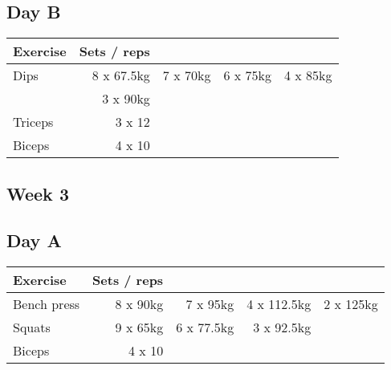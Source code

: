 \documentclass[12pt, a4paper]{article}%
\begin{document}
  \subsection*{\hspace{0.5em} Day B }


  \begin{tabular}{l|rrrr}
  \hspace{0.75em} \textbf{Exercise} & \textbf{Sets / reps} \\ \hline

            \hspace{0.75em} Dips
            & 8 x 67.5kg
            & 7 x 70kg
            & 6 x 75kg
            & 4 x 85kg
            \\


            \hspace{0.75em}
            & 3 x 90kg
            & 
            & 
            & 
            \\


   \hspace{0.75em} Triceps & 3 x 12 \\
   \hspace{0.75em} Biceps & 4 x 10 \\
  \end{tabular}

 \subsection*{\hspace{0.25em} Week 3 }
  \subsection*{\hspace{0.5em} Day A }


  \begin{tabular}{l|rrrr}
  \hspace{0.75em} \textbf{Exercise} & \textbf{Sets / reps} \\ \hline

            \hspace{0.75em} Bench press
            & 8 x 90kg
            & 7 x 95kg
            & 4 x 112.5kg
            & 2 x 125kg
            \\


            \hspace{0.75em} Squats
            & 9 x 65kg
            & 6 x 77.5kg
            & 3 x 92.5kg
            & 
            \\


   \hspace{0.75em} Biceps & 4 x 10 \\
  \end{tabular}
\end{document}
